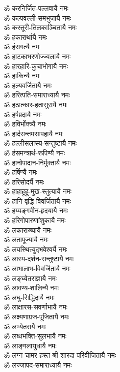 \begin{multicols}{2}
\begin{flushleft}
ॐ करनिर्जित-पल्लवायै नमः\\
ॐ कल्पवल्ली-समभुजायै नमः\\
ॐ कस्तूरी-तिलकाञ्चितायै नमः\hfill {}\\
ॐ हकारार्थायै नमः\\
ॐ हंसगत्यै नमः\\
ॐ हाटकाभरणोज्ज्वलायै नमः\\
ॐ हारहारि-कुचाभोगायै नमः\\
ॐ हाकिन्यै नमः\\
ॐ हल्यवर्जितायै नमः\\
ॐ हरित्पति-समाराध्यायै नमः\\
ॐ हठात्कार-हतासुरायै नमः\\
ॐ हर्षप्रदायै नमः\\
ॐ हविर्भोक्त्र्यै नमः\hfill {}\\
ॐ हार्दसन्तमसापहायै नमः\\
ॐ हल्लीसलास्य-सन्तुष्टायै नमः\\
ॐ हंसमन्त्रार्थ-रूपिण्यै नमः\\
ॐ हानोपादान-निर्मुक्तायै नमः\\
ॐ हर्षिण्यै नमः\\
ॐ हरिसोदर्यै नमः\\
ॐ हाहाहूहू-मुख-स्तुत्यायै नमः\\
ॐ हानि-वृद्धि-विवर्जितायै नमः\\
ॐ हय्यङ्गवीन-हृदयायै नमः\\
ॐ हरिगोपारुणांशुकायै नमः\hfill {}\\
ॐ लकाराख्यायै नमः\\
ॐ लतापूज्यायै नमः\\
ॐ लयस्थित्युद्भवेश्वर्यै नमः\\
ॐ लास्य-दर्शन-सन्तुष्टायै नमः\\
ॐ लाभालाभ-विवर्जितायै नमः\\
ॐ लङ्घ्येतराज्ञायै नमः\\
ॐ लावण्य-शालिन्यै नमः\\
ॐ लघु-सिद्धिदायै नमः\\
ॐ लाक्षारस-सवर्णाभायै नमः\\
ॐ लक्ष्मणाग्रज-पूजितायै नमः\hfill {}\\
ॐ लभ्येतरायै नमः\\
ॐ लब्धभक्ति-सुलभायै नमः\\
ॐ लाङ्गलायुधायै नमः\\
ॐ लग्न-चामर-हस्त-श्री-शारदा-परिवीजितायै नमः\\
ॐ लज्जापद-समाराध्यायै नमः\\

\end{flushleft}
\end{multicols}
